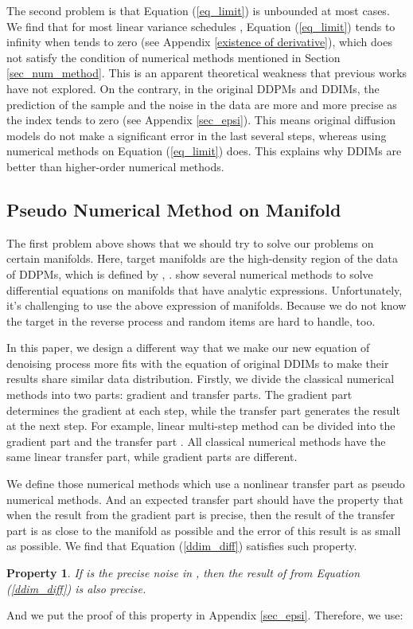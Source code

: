 \documentclass{article}
\newtheorem{property}{Property}[section]
\begin{document}
The second problem is that Equation (\ref{eq_limit}) is unbounded at most cases. We find that for most linear variance schedules , Equation (\ref{eq_limit}) tends to infinity when  tends to zero (see Appendix \ref{existence of derivative}), which does not satisfy the condition of numerical methods mentioned in Section \ref{sec_num_method}. This is an apparent theoretical weakness that previous works have not explored. On the contrary, in the original DDPMs and DDIMs, the prediction of the sample  and the noise  in the data are more and more precise as the index  tends to zero (see Appendix \ref{sec_epsi}). This means original diffusion models do not make a significant error in the last several steps, whereas using numerical methods on Equation (\ref{eq_limit}) does. This explains why DDIMs are better than higher-order numerical methods.




\subsection{Pseudo Numerical Method on Manifold}
\label{sec_pseudo}

The first problem above shows that we should try to solve our problems on certain manifolds. Here, target manifolds are the high-density region of the data  of DDPMs, which is defined by , .  \citet{Hairer1996} show several numerical methods to solve differential equations on manifolds that have analytic expressions. Unfortunately, it's challenging to use the above expression of manifolds. Because we do not know the target  in the reverse process and random items  are hard to handle, too. 

In this paper, we design a different way that we make our new equation of denoising process more fits with the equation of original DDIMs to make their results share similar data distribution. Firstly, we divide the classical numerical methods into two parts: gradient and transfer parts. The gradient part determines the gradient at each step, while the transfer part generates the result at the next step. For example, linear multi-step method can be divided into the gradient part  and the transfer part . All classical numerical methods have the same linear transfer part, while gradient parts are different.

We define those numerical methods which use a nonlinear transfer part as pseudo numerical methods. And an expected transfer part should have the property that when the result from the gradient part is precise, then the result of the transfer part is as close to the manifold as possible and the error of this result is as small as possible. We find that Equation (\ref{ddim_diff}) satisfies such property.
\begin{property}
   If  is the precise noise in , then the result of  from Equation (\ref{ddim_diff}) is also precise.
   \label{pro_pre}
   \vspace*{-0.4cm}
\end{property}
And we put the proof of this property in Appendix \ref{sec_epsi}. Therefore, we use: 
\end{document}
